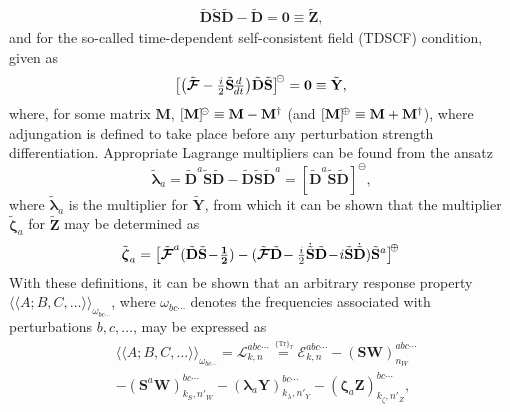 \documentclass[%
 reprint,
 amsmath,amssymb,
 aps,
]{revtex4-1}
\begin{document}
\begin{eqnarray}\label{idempotency}
\tilde{\mathbf{D}} \tilde{\mathbf{S}} \tilde{\mathbf{D}} - \tilde{\mathbf{D}} = \mathbf{0} \equiv \tilde{\mathbf{Z}}
\text{,}
\end{eqnarray}
and for the so-called time-dependent self-consistent field (TDSCF) condition, given as
\begin{eqnarray}\label{TDSCF}
\bigr[\bigl(\tilde{\mbox{\boldmath $ \mathcal{F} $}} - {\textstyle \frac{i}{2}} \tilde{\mathbf{S}} 
\!{\textstyle \frac{d}{dt}} \bigr) \tilde{\mathbf{D}} \tilde{\mathbf{S}} \bigr]^{\negmedspace\circleddash} = \mathbf{0} \equiv \tilde{\mathbf{Y}}
\text{,}
\end{eqnarray}
where, for some matrix $\mathbf{M}$, $[\mathbf{M}]^{\negmedspace\circleddash} \equiv \mathbf{M} - \mathbf{M}^{\dagger}$ (and $[\mathbf{M}]^{\negmedspace\oplus} \equiv \mathbf{M} + \mathbf{M}^{\dagger}$), where adjungation is defined to take place before any perturbation  strength differentiation. 
Appropriate Lagrange multipliers can be found from the ansatz
\begin{equation}
\tilde{\bm{\lambda}}_a = \tilde{\mathbf{D}}^{a}\tilde{\mathbf{S}} \tilde{\mathbf{D}}-\tilde{\mathbf{D}} \tilde{\mathbf{S}} \tilde{\mathbf{D}}^{a}=[\tilde{\mathbf{D}}^{a}\tilde{\mathbf{S}} \tilde{\mathbf{D}}]^{\!\ominus} \label{LagrMulXg} \text{,}
\end{equation}
where $\tilde{\bm{\lambda}}_{a}$ is the multiplier for $\tilde{\mathbf{Y}}$, from which it can be shown  that the multiplier $\tilde{\bm{\zeta}}_a$ for $\tilde{\mathbf{Z}}$ may be determined as
\begin{equation}
\tilde{\mbox{\boldmath $ \zeta $}}_a=\bigl[\tilde{\mbox{\boldmath $ \mathcal{F} $}}^{a}(\tilde{\mathbf{D}} \tilde{\mathbf{S}}\!-\!{\textstyle \mathbf{\frac{1}{2}}})-(\tilde{\mbox{\boldmath $ \mathcal{F} $}} \tilde{\mathbf{D}}\!-{\textstyle \frac{i}{2}}\dot{\tilde{\mathbf{S}}} \tilde{\mathbf{D}}
\!-\! i\tilde{\mathbf{S}} \dot{\tilde{\mathbf{D}}})\tilde{\mathbf{S}}^{a}\bigr]^{\negmedspace\oplus}\label{LagrMulLg}
\end{equation}
With these definitions, it can be shown  that an arbitrary response property $\langle \langle A ; B, C, \ldots \rangle \rangle_{\omega_{bc\cdots}}$, where $\omega_{bc\cdots}$ denotes the frequencies associated with perturbations $b, c, \ldots$, may be expressed as
\begin{equation}\label{master}
\begin{split}
& \langle \langle A ; B, C, \ldots \rangle \rangle_{\omega_{bc\cdots}} = \mathcal{L}_{k,n}^{abc\cdots} \stackrel{\,^{\{\mathrm{Tr}\}_T}}{=} 
 \mathcal{E}_{k,n}^{abc\cdots} - (\mathbf{SW})_{n_{W}}^{abc\cdots} \\ & - (\mathbf{S}^{a}\mathbf{W})_{k_{S},n'_{W}}^{bc\cdots} - (\mathbf{\lambda}_{a}\mathbf{Y})_{k_{\lambda},n'_{Y}}^{bc\cdots} - (\mathbf{\zeta}_{a}\mathbf{Z})_{k_{\zeta},n'_{Z}}^{bc\cdots}\text{,}
\end{split}
\end{equation}
\end{document}
